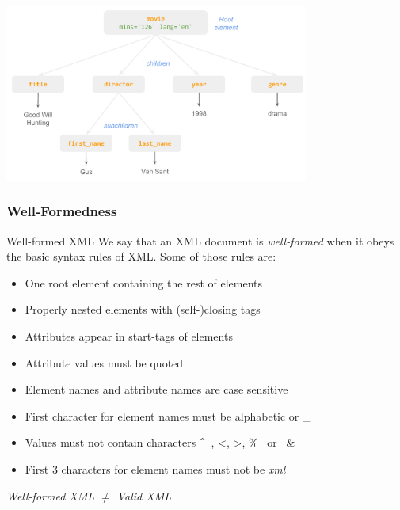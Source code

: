 \documentclass[svgnames]{beamer}
\begin{document}
\begin{frame}
\frametitle{}
\begin{center}
\includegraphics[width=10cm]{xml_movie_tree2.pdf}
\end{center}
\end{frame}


\begin{frame}
\frametitle{Well-Formedness}

\begin{block}{Well-formed XML}
We say that an XML document is \emph{well-formed} when it obeys the basic syntax rules of XML. Some of those rules are:
\begin{itemize}
 \item One root element containing the rest of elements
 \item Properly nested elements with (self-)closing tags
 \item Attributes appear in start-tags of elements
 \item Attribute values must be quoted
 \item Element names and attribute names are case sensitive
 \item First character for element names must be alphabetic or \_
 \item Values must not contain characters \^~, <, >, \% ~or~ \&
 \item First 3 characters for element names must not be {\it xml}
\end{itemize}
\end{block}

\begin{block}{}
\begin{center}
\emph{Well-formed XML $\neq$ Valid XML}
\end{center}
\end{block}

\end{frame}
\end{document}
